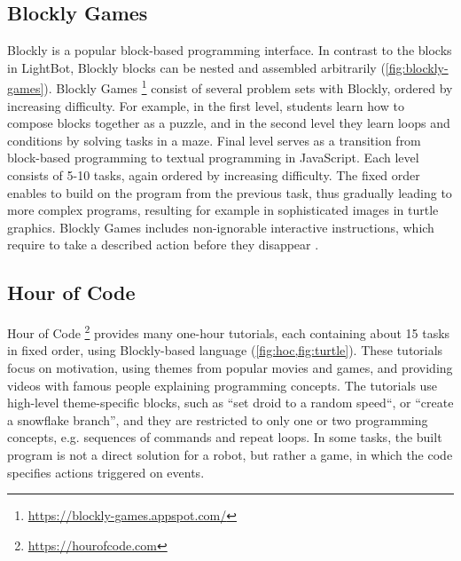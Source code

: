 \subsection{Blockly Games}
\label{sec:blockly-games}
Blockly is a popular block-based programming interface.
In contrast to the blocks in LightBot,
Blockly blocks can be nested and assembled arbitrarily %
(\cref{fig:blockly-games}).
Blockly Games%
\footnote{\url{https://blockly-games.appspot.com/}}
consist of several problem sets with Blockly, ordered by increasing difficulty.
For example, in the first level, students learn how to compose blocks together
as a puzzle, and in the second level they learn loops and conditions by solving
tasks in a maze. Final level serves as a transition from block-based
programming to textual programming in JavaScript.
Each level consists of 5-10 tasks, again ordered by increasing difficulty. %
The fixed order enables to build on the program from the previous task,
thus gradually leading to more complex programs,
resulting for example in sophisticated images in turtle graphics.
Blockly Games includes non-ignorable interactive instructions,
which require to take a described action before they disappear
\cite{blockly-10-things}.


\subsection{Hour of Code}
\label{sec:hoc}
Hour of Code%
\footnote{\url{https://hourofcode.com}}
provides many one-hour tutorials, each containing about 15 tasks in fixed order,
using Blockly-based language
(\cref{fig:hoc,fig:turtle}).
These tutorials focus on motivation, using themes from popular movies and
games, and providing videos with famous people explaining programming concepts.
The tutorials use high-level theme-specific blocks, such as ``set droid to a
random speed``, or ``create a snowflake branch'',
and they are restricted to only one or two programming
concepts, e.g. sequences of commands and repeat loops. %
In some tasks, the built program is not a direct solution for a robot,
but rather a game, in which the code specifies actions triggered on events.




